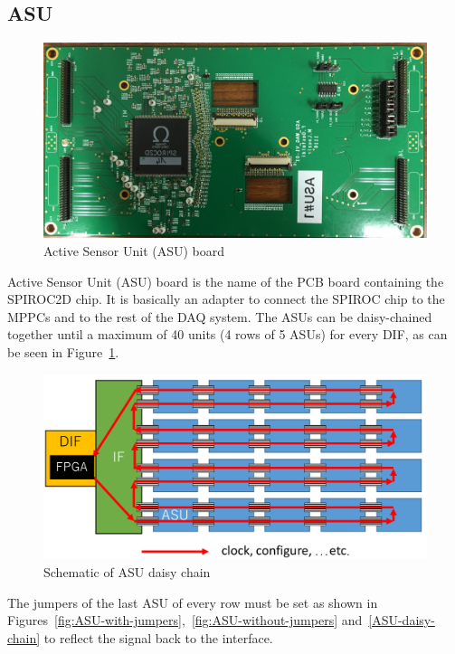 \subsection{ASU}\label{sec:ASU}
\begin{figure}[ht]
  \centering \includegraphics[width=0.8\linewidth, frame]{ASU}
  \caption{Active Sensor Unit (ASU) board}
\end{figure}
Active Sensor Unit (ASU) board is the name of the PCB board containing the
SPIROC2D chip. It is basically an adapter to connect the SPIROC chip to the
MPPCs and to the rest of the DAQ system. The ASUs can be daisy-chained together
until a maximum of 40 units (4 rows of 5 ASUs) for every DIF, as can be seen in
Figure~\ref{daisy-chain}.
\begin{figure}[ht]
  \centering \includegraphics[width=0.7\linewidth]{daisy-chain}
  \caption{Schematic of ASU daisy chain}\label{daisy-chain}
\end{figure}
The jumpers of the last ASU of every row must be set as shown in
Figures~\ref{fig:ASU-with-jumpers},~\ref{fig:ASU-without-jumpers}
and~\ref{ASU-daisy-chain} to reflect the signal back to the interface.
